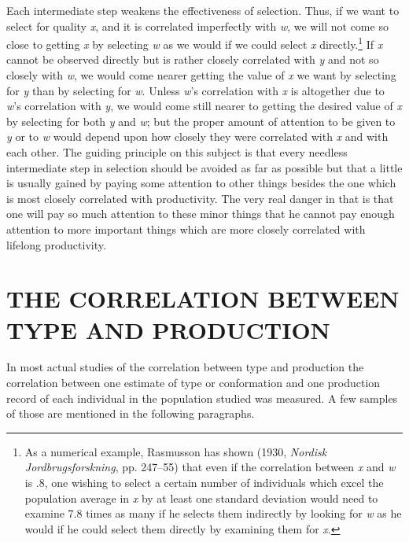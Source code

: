 Each intermediate step weakens the effectiveness of selection. Thus,
if we want to select for quality \textit{x}, and it is correlated
imperfectly with \textit{w}, we will not come so close to getting
\textit{x} by selecting \textit{w} as we would if we could select
\textit{x} directly.\footnote{As a numerical example, Rasmusson has
shown (1930, \textit{Nordisk Jordbrugsforskning}, pp. 247--55) that
even if the correlation between \textit{x} and \textit{w} is .8, one
wishing to select a certain number of individuals which excel the
population average in \textit{x} by at least one standard deviation
would need to examine 7.8 times as many if he selects them indirectly
by looking for \textit{w} as he would if he could select them directly
by examining them for \textit{x}.} If \textit{x} cannot be observed
directly but is rather closely correlated with \textit{y} and not so
closely with \textit{w}, we would come nearer getting the value of
\textit{x} we want by selecting for \textit{y} than by selecting for
\textit{w}. Unless \textit{w}'s correlation with \textit{x} is
altogether due to \textit{w}'s correlation with \textit{y}, we would
come still nearer to getting the desired value of \textit{x} by
selecting for both \textit{y} and \textit{w}; but the proper amount of
attention to be given to \textit{y} or to \textit{w} would depend upon
how closely they were correlated with \textit{x} and with each other.
The guiding principle on this subject is that every needless intermediate
step in selection should be avoided as far as possible but that a little
is usually gained by paying some attention to other things besides the one
which is most closely correlated with productivity. The very real danger
in that is that one will pay so much attention to these minor things that
he cannot pay enough attention to more important things which are more
closely correlated with lifelong productivity.

\section*{THE CORRELATION BETWEEN TYPE AND PRODUCTION}

In most actual studies of the correlation between type and production
the correlation between one estimate of type or conformation and
one production record of each individual in the population studied was
measured. A few samples of those are mentioned in the following paragraphs.

